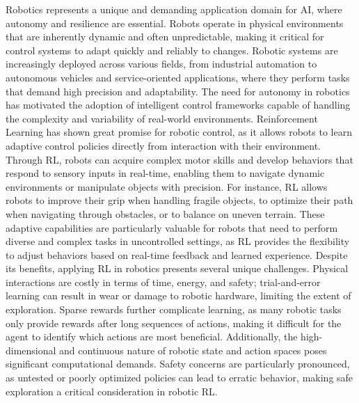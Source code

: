 Robotics represents a unique and demanding application domain for AI, where autonomy and resilience are essential.
Robots operate in physical environments that are inherently dynamic and often unpredictable, making it critical for
control systems to adapt quickly and reliably to changes.
Robotic systems are increasingly deployed across various fields, from industrial automation to autonomous vehicles and
service-oriented applications, where they perform tasks that demand high precision and adaptability.
The need for autonomy in robotics has motivated the adoption of intelligent control frameworks capable of handling the
complexity and variability of real-world environments.
Reinforcement Learning has shown great promise for robotic control, as it allows robots to learn adaptive control
policies directly from interaction with their environment.
Through RL, robots can acquire complex motor skills and develop behaviors that respond to sensory inputs in real-time,
enabling them to navigate dynamic environments or manipulate objects with precision.
For instance, RL allows robots to improve their grip when handling fragile objects, to optimize their path when
navigating through obstacles, or to balance on uneven terrain.
These adaptive capabilities are particularly valuable for robots that need to perform diverse and complex tasks in
uncontrolled settings, as RL provides the flexibility to adjust behaviors based on real-time feedback and learned
experience.
Despite its benefits, applying RL in robotics presents several unique challenges.
Physical interactions are costly in terms of time, energy, and safety; trial-and-error learning can result in wear or
damage to robotic hardware, limiting the extent of exploration.
Sparse rewards further complicate learning, as many robotic tasks only provide rewards after long sequences of actions,
making it difficult for the agent to identify which actions are most beneficial.
Additionally, the high-dimensional and continuous nature of robotic state and action spaces poses significant
computational demands.
Safety concerns are particularly pronounced, as untested or poorly optimized policies can lead to erratic behavior,
making safe exploration a critical consideration in robotic RL.


